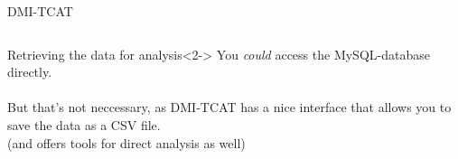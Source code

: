 \documentclass{beamer}
\begin{document}
\begin{frame}[t]{DMI-TCAT}
\begin{columns}
\begin{block}{Retrieving the data for analysis}<2->
You \emph{could} access the MySQL-database directly. 
\\~\\
But that's not neccessary, as DMI-TCAT has a nice interface that allows you to save the data as a CSV file. \\
\footnotesize{(and offers tools for direct analysis as well)}
\end{block}
\end{columns}
\end{frame}


\end{document}
